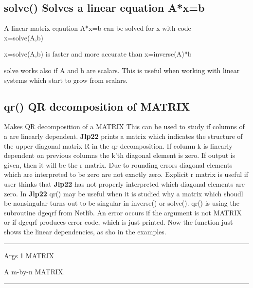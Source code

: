 \subsection{\textcolor{VioletRed}{solve}() Solves a linear equation A*x=b}
\label{solve}
A linear matrix eqaution A*x=b can be solved for x with code\\
x=\textcolor{VioletRed}{solve}(A,b)
\begin{note}
x=\textcolor{VioletRed}{solve}(A,b) is faster and more accurate than x=\textcolor{VioletRed}{inverse}(A)*b
\end{note}
\begin{note}
solve works also if A and b are scalars. This is useful when
working with linear systems which start to grow from scalars.
\end{note}
\subsection{\textcolor{VioletRed}{qr}() QR decomposition of MATRIX}
\label{qr}
Makes QR decomposition of a MATRIX This can be used to study if columns of a are linearly
dependent. \textbf{Jlp22} prints a matrix which indicates the structure of the upper diagonal matrix R in the
qr decomposition. If column k is linearly dependent on previous columns the k’th diagonal
element is zero. If output is given, then it will be the r matrix. Due to rounding errors diagonal
elements which are interpreted to be zero are not exactly zero. Explicit r matrix is useful if user
thinks that \textbf{Jlp22} has not properly interpreted which diagonal elements are zero.
In \textbf{Jlp22}  \textcolor{VioletRed}{qr}() may be useful when it is studied why a matrix which shoudl
be nonsingular turns out to be singular in \textcolor{VioletRed}{inverse}() or \textcolor{VioletRed}{solve}().
\textcolor{VioletRed}{qr}() is using  the subroutine dgeqrf from Netlib.
An error occurs if the argument is not MATRIX or if dgeqrf produces
error code, which is just printed.
Now the function just shows the linear dependencies, as sho in the examples.
\vspace{0.3cm}
\hrule
\vspace{0.3cm}
\noindent Args \tabto{3cm} 1 \tabto{5cm}  MATRIX \tabto{7cm}
\begin{changemargin}{3cm}{0cm}
\noindent A m-by-n MATRIX.
\end {changemargin}
\hrule
\vspace{0.2cm}
